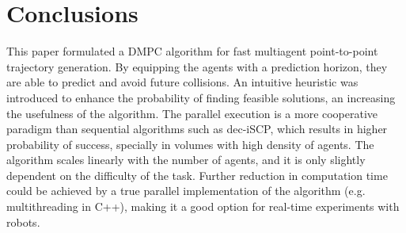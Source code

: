 \section{Conclusions}
\label{sec:conclusions}

This paper formulated a DMPC algorithm for fast multiagent point-to-point trajectory generation. By equipping the agents with a prediction horizon, they are able to predict and avoid future collisions. An intuitive heuristic was introduced to enhance the probability of finding feasible solutions, an increasing the usefulness of the algorithm.  The parallel execution is a more cooperative paradigm than sequential algorithms such as dec-iSCP, which results in higher probability of success, specially in volumes with high density of agents. The algorithm scales linearly with the number of agents, and it is only slightly dependent on the difficulty of the task. Further reduction in computation time could be achieved by a true parallel implementation of the algorithm (e.g. multithreading in C++), making it a good option for real-time experiments with robots.
